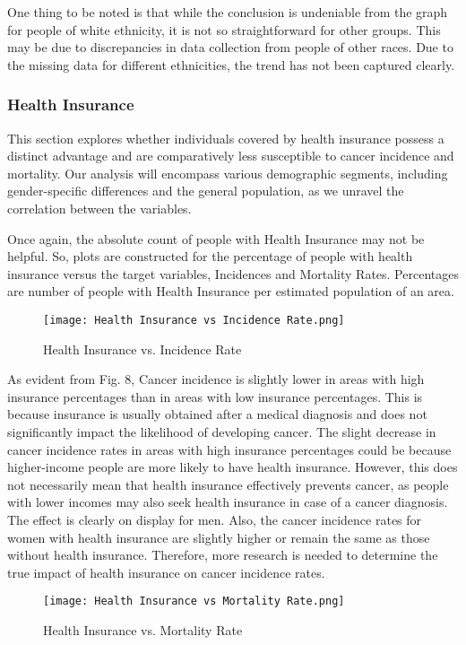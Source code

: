 \documentclass[conference]{IEEEtran}
\begin{document}
One thing to be noted is that while the conclusion is undeniable from the graph for people of white ethnicity, it is not so straightforward for other groups. This may be due to discrepancies in data collection from people of other races. Due to the missing data for different ethnicities, the trend has not been captured clearly.

\subsubsection{Health Insurance}
This section explores whether individuals covered by health insurance possess a distinct advantage and are comparatively less susceptible to cancer incidence and mortality. Our analysis will encompass various demographic segments, including gender-specific differences and the general population, as we unravel the correlation between the variables.

Once again, the absolute count of people with Health Insurance may not be helpful. So, plots are constructed for the percentage of people with health insurance versus the target variables, Incidences and Mortality Rates. Percentages are number of people with Health Insurance per estimated population of an area.

\begin{figure}[htbp]
\centerline{\texttt{[image: Health Insurance vs Incidence Rate.png]}}
\caption{Health Insurance vs. Incidence Rate}
\label{fig}
\end{figure}

As evident from Fig. 8, Cancer incidence is slightly lower in areas with high insurance percentages than in areas with low insurance percentages. This is because insurance is usually obtained after a medical diagnosis and does not significantly impact the likelihood of developing cancer. The slight decrease in cancer incidence rates in areas with high insurance percentages could be because higher-income people are more likely to have health insurance. However, this does not necessarily mean that health insurance effectively prevents cancer, as people with lower incomes may also seek health insurance in case of a cancer diagnosis. The effect is clearly on display for men. Also, the cancer incidence rates for women with health insurance are slightly higher or remain the same as those without health insurance. Therefore, more research is needed to determine the true impact of health insurance on cancer incidence rates.

\begin{figure}[htbp]
\centerline{\texttt{[image: Health Insurance vs Mortality Rate.png]}}
\caption{Health Insurance vs. Mortality Rate}
\label{fig}
\end{figure}
\end{document}
